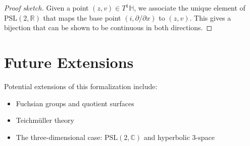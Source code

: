 \begin{proof}[Proof sketch]
Given a point $(z, v) \in T^1\mathbb{H}$, we associate the unique element of $\mathrm{PSL}(2,\mathbb{R})$ that maps the base point $(i, \partial/\partial x)$ to $(z, v)$. This gives a bijection that can be shown to be continuous in both directions.
\end{proof}

\section{Future Extensions}

Potential extensions of this formalization include:
\begin{itemize}
\item Fuchsian groups and quotient surfaces
\item Teichmüller theory
\item The three-dimensional case: $\mathrm{PSL}(2,\mathbb{C})$ and hyperbolic 3-space
\end{itemize}
